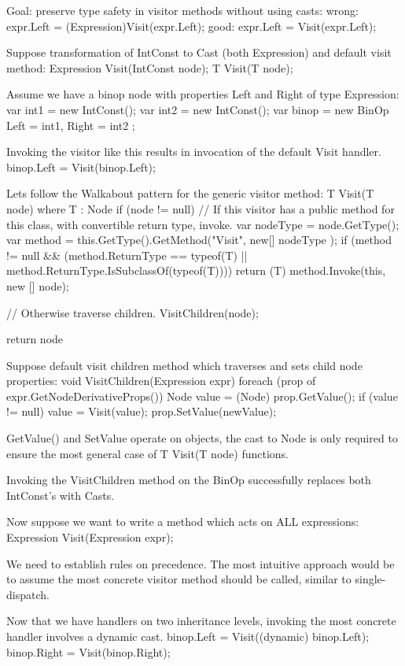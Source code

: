 \documentclass[final,a4paper,12pt]{article}
\begin{document}
Goal: preserve type safety in visitor methods without using casts:
	wrong:	expr.Left = (Expression)Visit(expr.Left);
	good:	expr.Left = Visit(expr.Left);
	


Suppose transformation of IntConst to Cast (both Expression) and default visit method:
	Expression Visit(IntConst node);
	T Visit(T node);

Assume we have a binop node with properties Left and Right of type Expression:
	var int1 = new IntConst();
	var int2 = new IntConst();
	var binop = new BinOp { Left = int1, Right = int2 };

Invoking the visitor like this results in invocation of the default Visit handler.
	binop.Left = Visit(binop.Left);
		
Lets follow the Walkabout pattern for the generic visitor method:
	T Visit(T node) where T : Node
		if (node != null)
			// If this visitor has a public method for this class, with convertible return type, invoke.
			var nodeType = node.GetType();
			var method = this.GetType().GetMethod("Visit", new[] { nodeType });
			if (method != null \&\& (method.ReturnType == typeof(T) || method.ReturnType.IsSubclassOf(typeof(T))))
				return (T) method.Invoke(this, new [] {node});
			
			// Otherwise traverse children.
			VisitChildren(node);
		
		return node
	
Suppose default visit children method which traverses and sets child node properties:
	void VisitChildren(Expression expr)
		foreach (prop of expr.GetNodeDerivativeProps())
			Node value = (Node) prop.GetValue();
			if (value != null)
				value = Visit(value);
				prop.SetValue(newValue);
				
GetValue() and SetValue operate on objects, the cast to Node is only required to ensure the most general case of T Visit(T node) functions.

Invoking the VisitChildren method on the BinOp successfully replaces both IntConst's with Casts.

Now suppose we want to write a method which acts on ALL expressions:
	Expression Visit(Expression expr);
	
We need to establish rules on precedence. The most intuitive approach would be to assume the most concrete visitor method should be called, similar to single-dispatch.

Now that we have handlers on two inheritance levels, invoking the most concrete handler involves a dynamic cast.
	binop.Left = Visit((dynamic) binop.Left);
	binop.Right = Visit(binop.Right);
\end{document}
